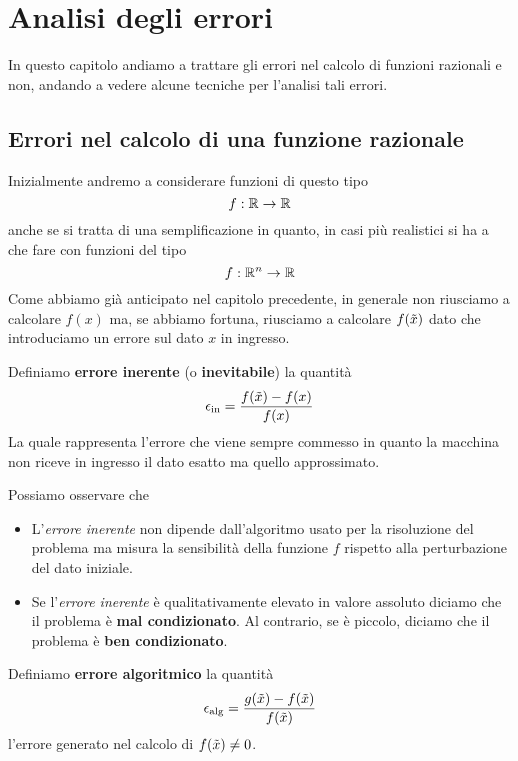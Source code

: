\chapter{Analisi degli errori}
In questo capitolo andiamo a trattare gli errori nel calcolo di funzioni razionali e non, andando a vedere
alcune tecniche per l'analisi tali errori.

\section{Errori nel calcolo di una funzione razionale}
Inizialmente andremo a considerare funzioni di questo tipo
\[ f : \mathbb{R} \to \mathbb{R}\]
anche se si tratta di una semplificazione in quanto, in casi più realistici si ha a che fare con funzioni del tipo
\[ f : \mathbb{R}^n \to \mathbb{R} \]
Come abbiamo già anticipato nel capitolo precedente, in generale non riusciamo a calcolare $f(x)$ ma, se abbiamo
fortuna, riusciamo a calcolare $f(\tilde{x})$ dato che introduciamo un errore sul dato $x$ in ingresso.

\begin{definition}
	Definiamo \textbf{errore inerente} (o \textbf{inevitabile}) la quantità
	\[ \epsilon_{\text{in}} = \frac{f(\tilde{x}) - f(x)}{f(x)} \]
	La quale rappresenta l'errore che viene sempre commesso in quanto la macchina non riceve in ingresso
	il dato esatto ma quello approssimato.
\end{definition}

\begin{observation}
	Possiamo osservare che
	\begin{itemize}
		\item L'\emph{errore inerente} non dipende dall'algoritmo usato per la risoluzione del problema ma
		      misura la sensibilità della funzione $f$ rispetto alla perturbazione del dato iniziale.
		\item Se l'\emph{errore inerente} è qualitativamente elevato in valore assoluto diciamo che il problema
		      è \textbf{mal condizionato}. Al contrario, se è piccolo, diciamo che il problema è
		      \textbf{ben condizionato}.
	\end{itemize}
\end{observation}

\begin{definition}
	Definiamo \textbf{errore algoritmico} la quantità
	\[ \epsilon_{\text{alg}} = \frac{g(\tilde{x}) - f(\tilde{x})}{f(\tilde{x})} \]
	l'errore generato nel calcolo di $f(\tilde{x}) \neq 0$.
\end{definition}

